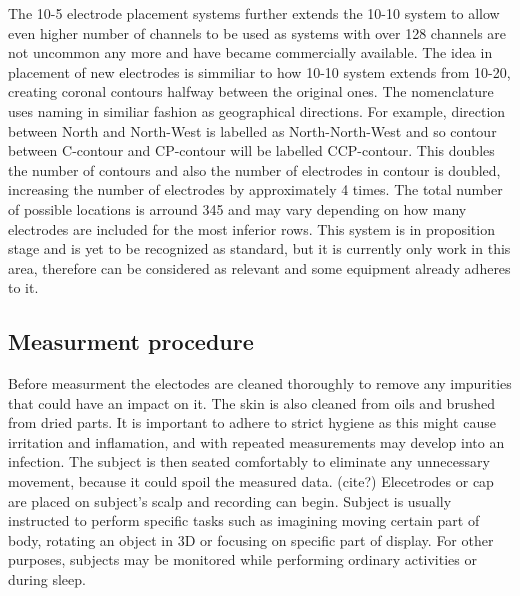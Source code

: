 The 10-5 electrode placement systems further extends the 10-10 system to allow
even higher number of channels to be used as systems with over 128 channels are
not uncommon any more and have became commercially available. The idea in
placement of new electrodes is simmiliar to how 10-10 system extends from 10-20,
creating coronal contours halfway between the original ones. The nomenclature
uses naming in similiar fashion as geographical directions. For example,
direction between North and North-West is labelled as North-North-West and so
contour between C-contour and CP-contour will be labelled CCP-contour.
This doubles the number of contours and also the number of electrodes in contour
is doubled, increasing the number of electrodes by approximately 4 times.
The total number of possible locations is arround 345 and may vary depending on
how many electrodes are included for the most inferior rows. \cite{placeSys}
This system is in proposition stage and is yet to be recognized as standard, but
it is currently only work in this area, therefore can be considered as relevant
and some equipment already adheres to it.

\subsection{Measurment procedure}
Before measurment the electodes are cleaned thoroughly to remove any impurities
that could have an impact on it. The skin is also cleaned from oils and brushed
from dried parts. It is important to adhere to strict hygiene as this might
cause irritation and inflamation, and with repeated measurements may develop
into an infection.\cite{eegFund} The subject is then seated comfortably to
eliminate any unnecessary movement, because it could spoil the measured data.
(cite?) Elecetrodes or cap are placed on subject's scalp and recording can
begin. Subject is usually instructed to perform specific tasks such as imagining
moving certain part of body, rotating an object in 3D or focusing on specific
part of display. \cite{bcComm} For other purposes, subjects may be monitored
while performing ordinary activities or during sleep.


